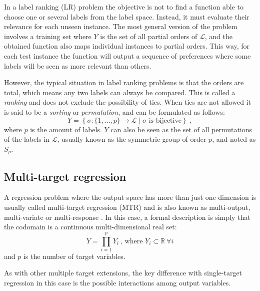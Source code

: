 In a label ranking (LR) problem  the objective is not to find a function able to choose one or several labels from the label space. Instead, it must evaluate their relevance for each unseen instance. The most general version of the problem involves a training set where $Y$ is the set of all partial orders of $\mathcal L$, and the obtained function also maps individual instances to partial orders. This way, for each test instance the function will output a sequence of preferences where some labels will be seen as more relevant than others. 

However, the typical situation in label ranking problems is that the orders are total, which means any two labels can always be compared. This is called a \emph{ranking} and does not exclude the possibility of ties. When ties are not allowed it is said to be a \emph{sorting} or \emph{permutation}, and can be formulated as follows:
\begin{equation}
Y=\left\{\sigma:\{1,\dots,p\}\rightarrow \mathcal L\mid\sigma\mbox{ is bijective}\right\}~,
\end{equation}
where $p$ is the amount of labels. $Y$ can also be seen as the set of all permutations of the labels in $\mathcal L$, usually known as the symmetric group of order $p$, and noted as $S_p$. 

\subsection{Multi-target regression}
\label{p3sec:mtarget}

A regression problem where the output space has more than just one dimension is usually called multi-target regression (MTR) and is also known as multi-output, multi-variate or multi-response . In this case, a formal description is simply that the codomain is a continuous multi-dimensional real set:
\begin{equation}
  Y=\prod_{i=1}^p Y_i~\mbox{, where }Y_i\subset\mathbb R~\forall i
  \end{equation}
and $p$ is the number of target variables.
 
As with other multiple target extensions, the key difference with single-target regression in this case is the possible interactions among output variables.

  

